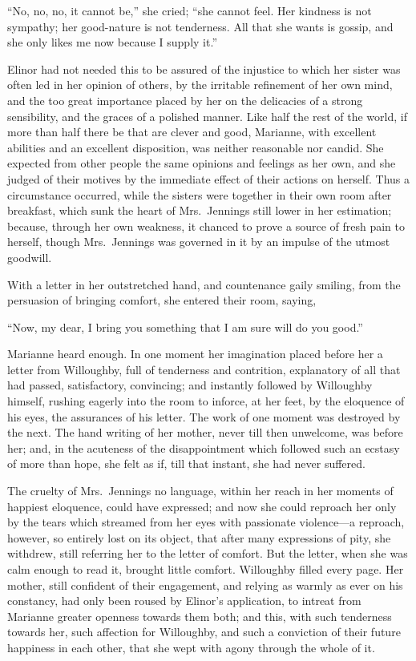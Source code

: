 \documentclass{article}
\begin{document}
``No, no, no, it cannot be,'' she cried;
``she cannot feel.  Her kindness is not sympathy;
her good-nature is not tenderness.  All that she wants
is gossip, and she only likes me now because I supply it.''

Elinor had not needed this to be assured of the injustice
to which her sister was often led in her opinion of others,
by the irritable refinement of her own mind, and the too
great importance placed by her on the delicacies of a
strong sensibility, and the graces of a polished manner.
Like half the rest of the world, if more than half there
be that are clever and good, Marianne, with excellent
abilities and an excellent disposition, was neither
reasonable nor candid.  She expected from other people
the same opinions and feelings as her own, and she judged
of their motives by the immediate effect of their actions
on herself.  Thus a circumstance occurred, while the
sisters were together in their own room after breakfast,
which sunk the heart of Mrs.\ Jennings still lower
in her estimation; because, through her own weakness,
it chanced to prove a source of fresh pain to herself,
though Mrs.\ Jennings was governed in it by an impulse
of the utmost goodwill.

With a letter in her outstretched hand, and countenance
gaily smiling, from the persuasion of bringing comfort,
she entered their room, saying,

``Now, my dear, I bring you something that I am sure
will do you good.''

Marianne heard enough.  In one moment her imagination
placed before her a letter from Willoughby, full of tenderness
and contrition, explanatory of all that had passed, satisfactory,
convincing; and instantly followed by Willoughby himself,
rushing eagerly into the room to inforce, at her feet,
by the eloquence of his eyes, the assurances of his letter.
The work of one moment was destroyed by the next.
The hand writing of her mother, never till then unwelcome,
was before her; and, in the acuteness of the disappointment
which followed such an ecstasy of more than hope,
she felt as if, till that instant, she had never suffered.

The cruelty of Mrs.\ Jennings no language, within
her reach in her moments of happiest eloquence,
could have expressed; and now she could reproach her
only by the tears which streamed from her eyes with
passionate violence---a reproach, however, so entirely
lost on its object, that after many expressions of pity,
she withdrew, still referring her to the letter of comfort.
But the letter, when she was calm enough to read it,
brought little comfort.  Willoughby filled every page.
Her mother, still confident of their engagement, and relying
as warmly as ever on his constancy, had only been roused
by Elinor's application, to intreat from Marianne greater
openness towards them both; and this, with such tenderness
towards her, such affection for Willoughby, and such
a conviction of their future happiness in each other,
that she wept with agony through the whole of it.
\end{document}

